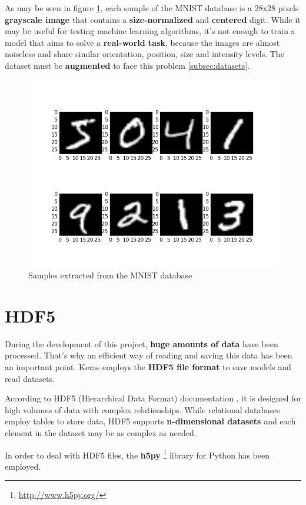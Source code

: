 As may be seen in figure \ref{fig:mnist}, each sample of the MNIST database is a 28x28 pixels \textbf{grayscale image} that contains a \textbf{size-normalized} and \textbf{centered} digit. While it may be useful for testing machine learning algorithms, it's not enough to train a model that aims to solve a \textbf{real-world task}, because the images are almost noiseless and share similar orientation, position, size and intensity levels. The dataset must be \textbf{augmented} to face this problem \ref{subsec:datasets}.
\begin{figure}
	\centering
	\includegraphics[width=12cm, keepaspectratio]{figures/mnist.png}
	\caption{Samples extracted from the MNIST database}
	\label{fig:mnist}
\end{figure}

\section{HDF5}\label{sec:hdf}
During the development of this project, \textbf{huge amounts of data} have been processed. That's why an efficient way of reading and saving this data has been an important point. Keras employs the \textbf{HDF5 file format} to save models and read datasets.

According to HDF5 (Hierarchical Data Format) documentation \cite{hdf5}, it is designed for high volumes of data with complex relationships. While relational databases employ tables to store data, HDF5 supports \textbf{n-dimensional datasets} and each element in the dataset may be as complex as needed.

In order to deal with HDF5 files, the \textbf{h5py} \footnote{\url{http://www.h5py.org/}} library for Python has been employed.

